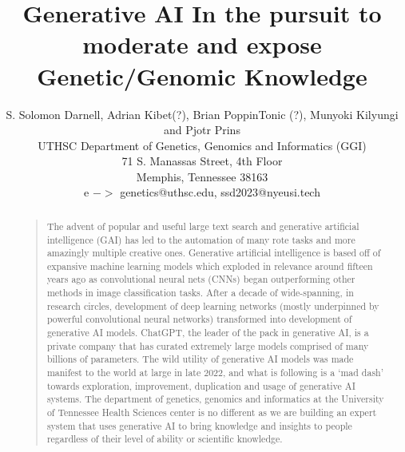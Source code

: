 \documentclass[letterpaper]{article}
\begin{document}
%
\title{Generative AI In the pursuit to moderate and expose\\ Genetic/Genomic Knowledge}
\author{S. Solomon Darnell, Adrian Kibet(?), Brian PoppinTonic (?), Munyoki Kilyungi and Pjotr Prins\\
UTHSC Department of Genetics, Genomics and Informatics (GGI)\\
71 S. Manassas Street, 4th Floor\\
Memphis, Tennessee 38163\\
e $->$ genetics@uthsc.edu, ssd2023@nyeusi.tech
}
\maketitle
\begin{abstract}
\begin{quote}
The advent of popular and useful large text search and generative artificial intelligence (GAI) has led to the automation of many rote tasks and more amazingly multiple creative ones.
Generative artificial intelligence is based off of expansive machine learning models which exploded in relevance around fifteen years ago as convolutional neural nets (CNNs) began outperforming other methods in image classification tasks.
After a decade of wide-spanning, in research circles, development of deep learning networks (mostly underpinned by powerful convolutional neural networks) transformed into development of generative AI models.
ChatGPT, the leader of the pack in generative AI, is a private company that has curated extremely large models comprised of many billions of parameters.
The wild utility of generative AI models was made manifest to the world at large in late 2022, and what is following is a `mad dash' towards exploration, improvement, duplication and usage of generative AI systems. 
The department of genetics, genomics and informatics at the University of Tennessee Health Sciences center is no different as we are building an expert system that uses generative AI to bring knowledge and insights to people regardless of their level of ability or scientific knowledge.
\end{quote}
\end{abstract}













%


\end{document}
